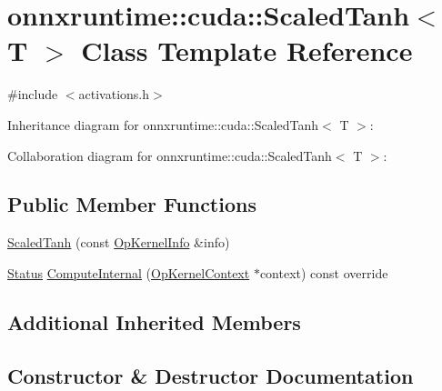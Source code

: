 \hypertarget{classonnxruntime_1_1cuda_1_1ScaledTanh}{}\section{onnxruntime\+:\+:cuda\+:\+:Scaled\+Tanh$<$ T $>$ Class Template Reference}
\label{classonnxruntime_1_1cuda_1_1ScaledTanh}


{\ttfamily \#include $<$activations.\+h$>$}



Inheritance diagram for onnxruntime\+:\+:cuda\+:\+:Scaled\+Tanh$<$ T $>$\+:


Collaboration diagram for onnxruntime\+:\+:cuda\+:\+:Scaled\+Tanh$<$ T $>$\+:
\subsection*{Public Member Functions}
\begin{DoxyCompactItemize}
\item 
\mbox{\hyperlink{classonnxruntime_1_1cuda_1_1ScaledTanh_a2f43d8199c3b078520bc4e031e779e92}{Scaled\+Tanh}} (const \mbox{\hyperlink{classonnxruntime_1_1OpKernelInfo}{Op\+Kernel\+Info}} \&info)
\item 
\mbox{\hyperlink{classonnxruntime_1_1common_1_1Status}{Status}} \mbox{\hyperlink{classonnxruntime_1_1cuda_1_1ScaledTanh_ae1ad07730687c6f16f28c496dddf9490}{Compute\+Internal}} (\mbox{\hyperlink{classonnxruntime_1_1OpKernelContext}{Op\+Kernel\+Context}} $\ast$context) const override
\end{DoxyCompactItemize}
\subsection*{Additional Inherited Members}


\subsection{Constructor \& Destructor Documentation}
\mbox{\label{classonnxruntime_1_1cuda_1_1ScaledTanh_a2f43d8199c3b078520bc4e031e779e92}} 
